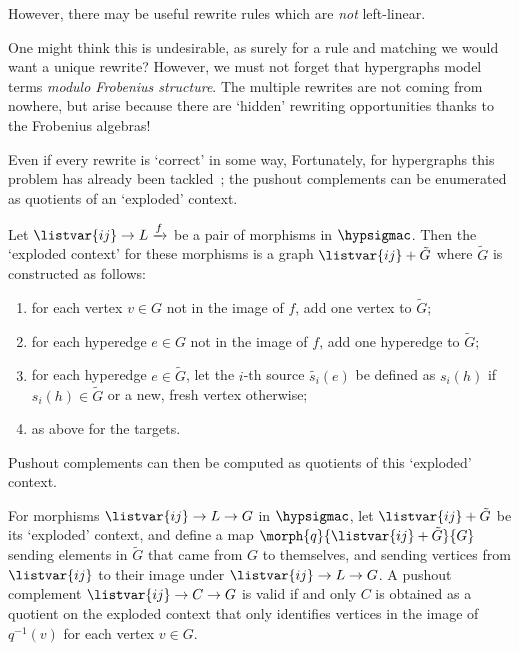 However, there may be useful rewrite rules which are \emph{not} left-linear.

\begin{example}
\end{example}

One might think this is undesirable, as surely for a rule and matching we would
want a unique rewrite?
However, we must not forget that hypergraphs model terms
\emph{modulo Frobenius structure}.
The multiple rewrites are not coming from nowhere, but arise because there are
`hidden' rewriting opportunities thanks to the Frobenius algebras!

\begin{example}
\end{example}

Even if every rewrite is `correct' in some way,
Fortunately, for hypergraphs this problem has already been
tackled~\cite{heumuller2011construction}; the pushout complements can be
enumerated as quotients of an `exploded' context.

\begin{definition}
    Let \(\listvar{ij} \to L \xrightarrow{f}\) be a pair of morphisms in
    \(\hypsigmac\).
    Then the `exploded context' for these morphisms is a graph
    \(\listvar{ij} + \tilde{G}\) where \(\tilde{G}\) is constructed as follows:
    \begin{enumerate}
        \item for each vertex \(v \in G\) not in the image of \(f\), add one
              vertex to \(\tilde{G}\);
        \item for each hyperedge \(e \in G\) not in the image of \(f\), add one
              hyperedge to \(\tilde{G}\);
        \item for each hyperedge \(e \in \tilde{G}\), let the \(i\)-th source
              \(\tilde{s_i}(e)\) be defined as \(s_i(h)\) if
              \(s_i(h) \in \tilde{G}\) or a new, fresh vertex otherwise;
        \item as above for the targets.
    \end{enumerate}
\end{definition}

Pushout complements can then be computed as quotients of this `exploded'
context.

\begin{proposition}
    For morphisms \(\listvar{ij} \to L \to G\) in \(\hypsigmac\), let
    \(\listvar{ij} + \tilde{G}\) be its `exploded' context, and define a map
    \(\morph{q}{\listvar{ij} + \tilde{G}}{G}\) sending elements in \(\tilde{G}\)
    that came from \(G\) to themselves, and sending vertices from
    \(\listvar{ij}\) to their image under \(\listvar{ij} \to L \to G\).
    A pushout complement \(\listvar{ij} \to C \to G\) is valid if and only
    \(C\) is obtained as a quotient on the exploded context
    that only identifies vertices in the image of \(q^{-1}(v)\) for each vertex
    \(v \in G\).
\end{proposition}

